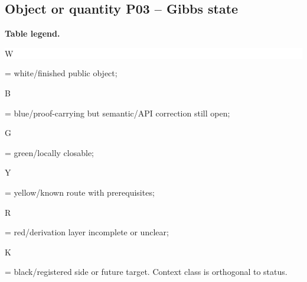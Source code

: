 \subsection*{Object or quantity P03 -- Gibbs state}
\hypertarget{objproof:P03}{}
\par\smallskip\noindent\begin{minipage}{0.99\linewidth}\footnotesize\raggedright\textbf{Table legend.} \colorbox{white}{\strut W} = white/finished public object; \colorbox{cyan!20}{\strut B} = blue/proof-carrying but semantic/API correction still open; \colorbox{green!18}{\strut G} = green/locally closable; \colorbox{yellow!25}{\strut Y} = yellow/known route with prerequisites; \colorbox{red!20}{\strut R} = red/derivation layer incomplete or unclear; \colorbox{black!18}{\strut K} = black/registered side or future target. Context class is orthogonal to status.\end{minipage}\par\vspace{0.25em}
